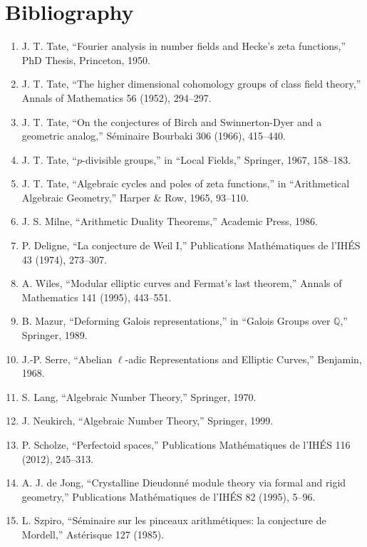 \section*{Bibliography}
\begin{enumerate}
\item J. T. Tate, ``Fourier analysis in number fields and Hecke's zeta functions,'' PhD Thesis, Princeton, 1950.
\item J. T. Tate, ``The higher dimensional cohomology groups of class field theory,'' Annals of Mathematics 56 (1952), 294--297.
\item J. T. Tate, ``On the conjectures of Birch and Swinnerton-Dyer and a geometric analog,'' S\'eminaire Bourbaki 306 (1966), 415--440.
\item J. T. Tate, ``$p$-divisible groups,'' in ``Local Fields,'' Springer, 1967, 158--183.
\item J. T. Tate, ``Algebraic cycles and poles of zeta functions,'' in ``Arithmetical Algebraic Geometry,'' Harper \& Row, 1965, 93--110.
\item J. S. Milne, ``Arithmetic Duality Theorems,'' Academic Press, 1986.
\item P. Deligne, ``La conjecture de Weil I,'' Publications Math\'ematiques de l'IH\'ES 43 (1974), 273--307.
\item A. Wiles, ``Modular elliptic curves and Fermat's last theorem,'' Annals of Mathematics 141 (1995), 443--551.
\item B. Mazur, ``Deforming Galois representations,'' in ``Galois Groups over $\mathbb{Q}$,'' Springer, 1989.
\item J.-P. Serre, ``Abelian $\ell$-adic Representations and Elliptic Curves,'' Benjamin, 1968.
\item S. Lang, ``Algebraic Number Theory,'' Springer, 1970.
\item J. Neukirch, ``Algebraic Number Theory,'' Springer, 1999.
\item P. Scholze, ``Perfectoid spaces,'' Publications Math\'ematiques de l'IH\'ES 116 (2012), 245--313.
\item A. J. de Jong, ``Crystalline Dieudonn\'e module theory via formal and rigid geometry,'' Publications Math\'ematiques de l'IH\'ES 82 (1995), 5--96.
\item L. Szpiro, ``S\'eminaire sur les pinceaux arithm\'etiques: la conjecture de Mordell,'' Ast\'erisque 127 (1985).
\end{enumerate}